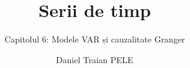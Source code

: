 \title[Serii de timp]{Serii de timp}
\subtitle{Capitolul 6: Modele VAR și cauzalitate Granger}
\author[D.T. Pele]{Daniel Traian PELE}
\date{}

\providecommand{\tsaapplink}[3]{\hypertarget{#2}{}\hyperlink{#1}{\beamergotobutton{#3}}}  %
\providecommand{\tsaappback}[2]{\begin{tikzpicture}[remember picture,overlay]\node[anchor=south east] at ([xshift=-3mm,yshift=7mm]current page.south east){\hyperlink{#1}{\beamerreturnbutton{#2}}};\end{tikzpicture}}  %
\providecommand{\tsachlink}[2]{\href{#1}{#2}}  %
\providecommand{\tsachlinkt}[2]{\href{#1}{\usebeamercolor[fg]{frametitle}#2}}  %


